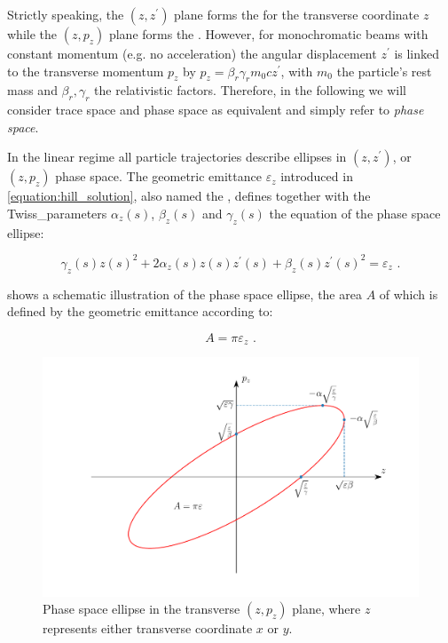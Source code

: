 \begin{noteblock}
    Strictly speaking, the \((z, z^{\prime})\) plane forms the  for the transverse coordinate \(z\) while the \((z, p_z)\) plane forms the .
    However, for monochromatic beams with constant momentum (e.g. no acceleration) the angular displacement \(z^{\prime}\) is linked to the transverse momentum \(p_z\) by \(p_z = \beta_r \gamma_r m_0 c z^{\prime}\), with \(m_0\) the particle's rest mass and \(\beta_r, \gamma_r\) the relativistic factors.
    Therefore, in the following we will consider trace space and phase space as equivalent and simply refer to \textit{phase space}.
\end{noteblock}

In the linear regime all particle trajectories describe ellipses in \((z, z^{\prime})\), or \((z, p_z)\) phase space.
The geometric emittance \(\varepsilon_z\) introduced in \cref{equation:hill_solution}, also named the , defines together with the \gls{Twiss_parameters} \(\alpha_z(s)\), \(\beta_z(s)\) and \(\gamma_z(s)\) the equation of the phase space ellipse:

\begin{equation}
    \gamma_z(s) z(s)^{2} + 2 \alpha_z(s) z(s) z^{\prime}(s) + \beta_z(s) z^{\prime}(s)^{2} = \varepsilon_z \text{ .}
    \label{equation:ellipse_equation}
\end{equation}
\vspace{0.3mm}

 shows a schematic illustration of the phase space ellipse, the area \(A\) of which is defined by the geometric emittance according to:

\begin{equation}
    A = \pi \varepsilon_z \text{ .}
    \label{equation:phase_space_ellipse_area}
\end{equation}

\begin{figure}[!htb]
    \centering
    \includegraphics[width=\linewidth]{Figures/Beam_Dynamics_Theory/phase_space_ellipse.pdf}
    \caption{Phase space ellipse in the transverse \((z, p_z)\) plane, where \(z\) represents either transverse coordinate \(x\) or \(y\).}
    \label{figure:phase_space_ellipse}
\end{figure}

